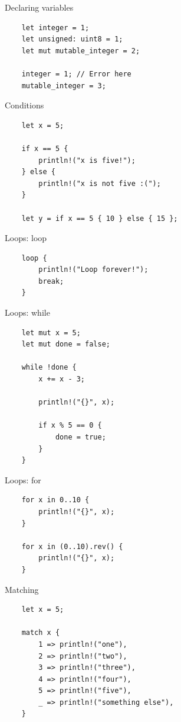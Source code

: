\documentclass[12pt, aspectratio=169]{beamer}
\begin{document}
\begin{frame}[fragile]{Declaring variables}
  \begin{verbatim}
    let integer = 1;
    let unsigned: uint8 = 1;
    let mut mutable_integer = 2;

    integer = 1; // Error here
    mutable_integer = 3;
  \end{verbatim}
\end{frame}

\begin{frame}[fragile]{Conditions}
  \begin{verbatim}
    let x = 5;

    if x == 5 {
        println!("x is five!");
    } else {
        println!("x is not five :(");
    }

    let y = if x == 5 { 10 } else { 15 };
  \end{verbatim}
\end{frame}

\begin{frame}[fragile]{Loops: loop}
  \begin{verbatim}
    loop {
        println!("Loop forever!");
        break;
    }
  \end{verbatim}
\end{frame}

\begin{frame}[fragile]{Loops: while}
  \begin{verbatim}
    let mut x = 5;
    let mut done = false;

    while !done {
        x += x - 3;

        println!("{}", x);

        if x % 5 == 0 {
            done = true;
        }
    }
  \end{verbatim}
\end{frame}

\begin{frame}[fragile]{Loops: for}
  \begin{verbatim}
    for x in 0..10 {
        println!("{}", x);
    }

    for x in (0..10).rev() {
        println!("{}", x);
    }
  \end{verbatim}
\end{frame}

\begin{frame}[fragile]{Matching}
  \begin{verbatim}
    let x = 5;

    match x {
        1 => println!("one"),
        2 => println!("two"),
        3 => println!("three"),
        4 => println!("four"),
        5 => println!("five"),
        _ => println!("something else"),
    }
  \end{verbatim}
\end{frame}
\end{document}
